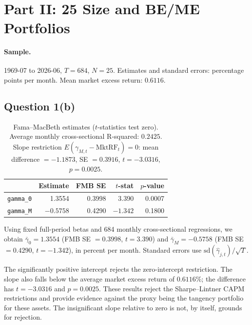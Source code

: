 \section{Part II: 25 Size and BE/ME Portfolios}

\paragraph{Sample.} 1969-07 to 2026-06, $T = 684$, $N = 25$. Estimates and
standard errors: percentage points per month. Mean market excess return:
$0.6116$.

\subsection{Question 1(b)}

\begin{table}[H]
\centering
\caption{Fama--MacBeth estimates ($t$-statistics test zero). Average monthly
cross-sectional R-squared: $0.2425$. Slope restriction
$E(\gamma_{M,t} - \mathrm{MktRF}_t) = 0$: mean difference $= -1.1873$,
SE $= 0.3916$, $t = -3.0316$, $p = 0.0025$.}
\small
\begin{tabular}{lrrrr}
\toprule
& Estimate & FMB SE & $t$-stat & $p$-value \\
\midrule
\texttt{gamma\_0} & 1.3554 & 0.3998 & 3.390 & 0.0007 \\
\texttt{gamma\_M} & $-0.5758$ & 0.4290 & $-1.342$ & 0.1800 \\
\bottomrule
\end{tabular}
\label{tab:p2b}
\end{table}

Using fixed full-period betas and 684 monthly cross-sectional regressions, we
obtain $\bar\gamma_0 = 1.3554$ (FMB SE $= 0.3998$, $t = 3.390$) and
$\bar\gamma_M = -0.5758$ (FMB SE $= 0.4290$, $t = -1.342$), in percent per
month. Standard errors use $\mathrm{sd}(\hat\gamma_{j,t})/\sqrt{T}$.

The significantly positive intercept rejects the zero-intercept restriction.
The slope also falls below the average market excess return of $0.6116\%$; the
difference has $t = -3.0316$ and $p = 0.0025$. These results reject the
Sharpe--Lintner CAPM restrictions and provide evidence against the proxy being
the tangency portfolio for these assets. The insignificant slope relative to
zero is not, by itself, grounds for rejection.

